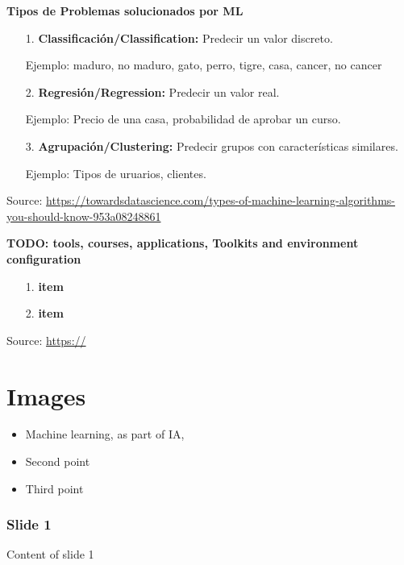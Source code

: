 \documentclass[english,svgnames,notes=hide,12pt]{beamer}
\begin{document}
\begin{frame}
    \textbf{Tipos de Problemas solucionados por ML}
    \begin{itemize}
        \item[\small{1.}] \textbf{Classificación/Classification:} Predecir un valor discreto.

        Ejemplo: {maduro, no maduro}, {gato, perro, tigre, casa}, {cancer, no cancer}

        \item[\small{2.}] \textbf{Regresión/Regression:} Predecir un valor real.

        Ejemplo: Precio de una casa, probabilidad de aprobar un curso.

        \item[\small{3.}] \textbf{Agrupación/Clustering:} Predecir grupos con características similares.

        Ejemplo: Tipos de uruarios, clientes.
    \end{itemize}

    \tiny{Source: \url{https://towardsdatascience.com/types-of-machine-learning-algorithms-you-should-know-953a08248861}}
\end{frame}

\begin{frame}
    \textbf{TODO: tools, courses, applications, Toolkits and environment configuration}
    \begin{itemize}
        \item[\small{1.}] \textbf{item} 
        \item[\small{2.}] \textbf{item}
    \end{itemize}

    \tiny{Source: \url{https://}}
\end{frame}


\section{Images}
\begin{frame}
\begin{itemize}[<+->]

    \item Machine learning, as part of IA,
    \item Second point
    \item Third point
\end{itemize}
	\frametitle{Slide 1}
	Content of slide 1
\end{frame}
\end{document}
